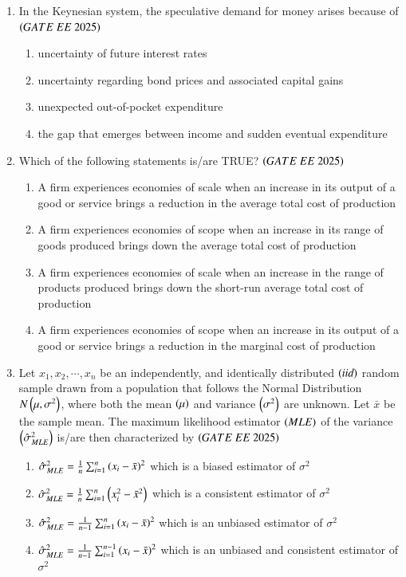 \documentclass[journal,12pt,onecolumn]{IEEEtran}
\theoremstyle{remark}
\begin{document}
\begin{enumerate}
\item In the Keynesian system, the speculative demand for money arises because of
\hfill $\brak{GATE\ EE\ 2025}$
    \begin{enumerate}
    \item uncertainty of future interest rates
    \item uncertainty regarding bond prices and associated capital gains
    \item unexpected out-of-pocket expenditure
    \item the gap that emerges between income and sudden eventual expenditure
   \end{enumerate}
 
\item Which of the following statements is/are TRUE?
\hfill $\brak{GATE\ EE\ 2025}$
    \begin{enumerate}
     \item A firm experiences economies of scale when an increase in its output of a good or service brings a reduction in the average total cost of production
    \item A firm experiences economies of scope when an increase in its range of goods produced brings down the average total cost of production
    \item A firm experiences economies of scale when an increase in the range of products produced brings down the short-run average total cost of production
    \item A firm experiences economies of scope when an increase in its output of a good or service brings a reduction in the marginal cost of production
   \end{enumerate}
     
    \item Let $x_1, x_2, \cdots, x_n$ be an independently, and identically distributed  $\left(\textit{iid}\right)$ random sample drawn from a population that follows the Normal Distribution $N \left(\mu, \sigma^2\right)$, where both the mean $\left(\mu\right)$ and variance $ \left(\sigma^2\right)$ are unknown. Let $\bar{x}$ be the sample mean. The maximum likelihood estimator  $\left(MLE\right)$ of the variance $\left(\hat{\sigma}^2_{MLE}\right)$ is/are then characterized by
    \hfill $\brak{GATE\ EE\ 2025}$
    \begin{enumerate}
    \item $\hat{\sigma}_{MLE}^2 = \frac{1}{n}\sum_{i=1}^{n} \left(x_i-\bar{x}\right)^2$ which is a biased estimator of $\sigma^2$
    \item $\hat{\sigma}_{MLE}^2 = \frac{1}{n}\sum_{i=1}^{n} \left(x_i^2-\bar{x}^2\right)$ which is a consistent estimator of $\sigma^2$
    \item $\hat{\sigma}_{MLE}^2 = \frac{1}{n-1}\sum_{i=1}^{n} \left(x_i-\bar{x}\right)^2$ which is an unbiased estimator of $\sigma^2$
    \item $\hat{\sigma}_{MLE}^2 = \frac{1}{n-1}\sum_{i=1}^{n-1} \left(x_i-\bar{x}\right)^2$ which is an unbiased and consistent estimator of $\sigma^2$
  \end{enumerate}
 

\end{enumerate}
\end{document}
